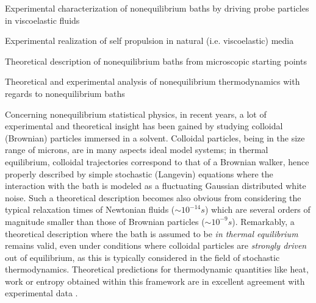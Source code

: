 \begin{workpackage}[id=WPbrown,wphases=0-48,
  short=Brown. particles, %
  title=Brownian particles in nonequilibrium baths, %
  lead=USTUTT,
  USTUTTRM=96,KULRM=6,ULEIRM=6,UNIPDRM=6]

\begin{wpobjectives}
\begin{compactitem}
\item Experimental characterization of nonequilibrium baths by driving probe particles in viscoelastic fluids
\item Experimental realization of self propulsion in natural (i.e. viscoelastic) media
\item Theoretical description of nonequilibrium baths from microscopic starting points
\item Theoretical and experimental analysis of nonequilibrium thermodynamics with regards to nonequilibrium baths
  \end{compactitem}
\end{wpobjectives}

\begin{wpdescription}

Concerning nonequilibrium statistical physics, in recent years, a lot of experimental and
theoretical insight has been gained by studying colloidal (Brownian) particles immersed in a solvent.
Colloidal particles, being in the size range of microns, are in many aspects ideal
model systems; in thermal equilibrium, colloidal trajectories correspond to that of a Brownian walker, hence properly described by
simple stochastic (Langevin) equations where the interaction with the bath is modeled as a fluctuating Gaussian distributed white noise. 
Such a theoretical description becomes also obvious from considering the typical relaxation times of Newtonian fluids ($\sim 10^{-14} s$) which are several orders of magnitude 
smaller than those of Brownian particles ($\sim 10^{-9} s$). Remarkably, a theoretical description where the bath is assumed to be {\it in thermal equilibrium} remains valid, even under conditions where colloidal particles are {\it strongly driven} out of equilibrium, as this is typically considered in the field of stochastic thermodynamics. Theoretical predictions for thermodynamic quantities like heat, work or entropy obtained within this framework are in excellent agreement with experimental data \cite{blickle2006, blickle2007, blickle2012}.



\end{wpdescription}
\end{workpackage}
